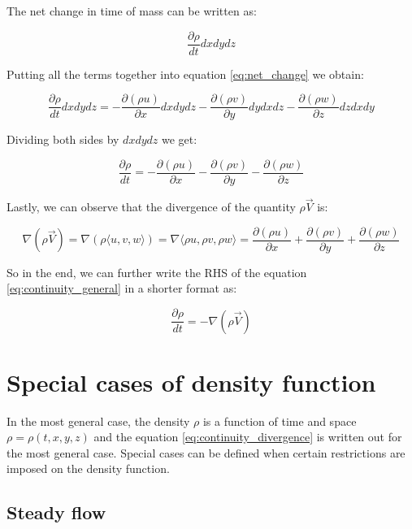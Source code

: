 The net change in time of mass can be written as:

\begin{equation}
\frac{\partial \rho}{dt} dx dy dz
\end{equation}

Putting all the terms together into equation \ref{eq:net_change} we obtain:

\begin{equation}
\frac{\partial \rho}{dt} dx dy dz = - \frac{\partial (\rho u)}{\partial x} dx dy dz - \frac{\partial (\rho v)}{\partial y} dy dx dz - \frac{\partial (\rho w)}{\partial z} dz dx dy
\end{equation}

Dividing both sides by $dx dy dz$ we get:

\begin{equation} \label{eq:continuity_general}
\frac{\partial \rho}{dt} = - \frac{\partial (\rho u)}{\partial x} - \frac{\partial (\rho v)}{\partial y} - \frac{\partial (\rho w)}{\partial z}
\end{equation}

Lastly, we can observe that the divergence of the quantity $\rho \vec{V}$ is:

\begin{equation}
\nabla (\rho \vec{V}) = \nabla (\rho \langle u, v, w \rangle) = \nabla \langle \rho u, \rho v, \rho w \rangle = \frac{\partial (\rho u)}{\partial x} + \frac{\partial (\rho v)}{\partial y} + \frac{\partial (\rho w)}{\partial z}
\end{equation}

So in the end, we can further write the RHS of the equation \ref{eq:continuity_general} in a shorter format as:

\begin{equation} \label{eq:continuity_divergence}
\frac{\partial \rho}{dt} = - \nabla (\rho \vec{V})
\end{equation}

\section{Special cases of density function}

In the most general case, the density $\rho$ is a function of time and space $\rho = \rho(t, x, y, z)$ and the equation \ref{eq:continuity_divergence} is written out for the most general case. Special cases can be defined when certain restrictions are imposed on the density function.

\subsection{Steady flow}

